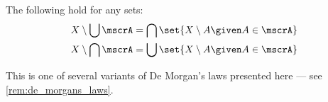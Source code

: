\begin{theorem}\label{thm:de_morgans_laws_for_sets}
  The following hold for any sets:
  \begin{align}
    X \setminus \bigcup \mscrA = \bigcap \set{ X \setminus A \given A \in \mscrA } \label{eq:thm:de_morgans_laws_for_sets/complement_of_union} \\
    X \setminus \bigcap \mscrA = \bigcup \set{ X \setminus A \given A \in \mscrA } \label{eq:thm:de_morgans_laws_for_sets/complement_of_intersection}
  \end{align}
\end{theorem}
\begin{comments}
  \item This is one of several variants of De Morgan's laws presented here --- see \cref{rem:de_morgans_laws}.
\end{comments}
